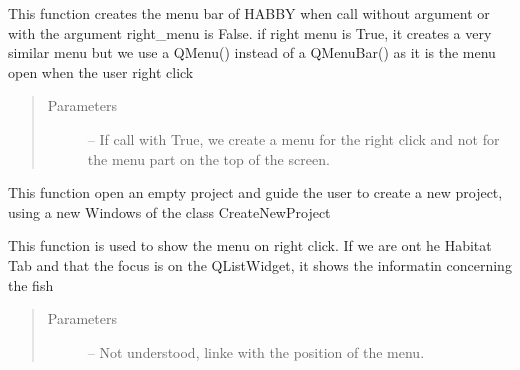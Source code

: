 \documentclass[letterpaper,10pt,english]{sphinxmanual}
\begin{document}
\begin{fulllineitems}
\begin{fulllineitems}
\end{fulllineitems}


\begin{fulllineitems}
\label{\detokenize{index:src_GUI.Main_windows_1.MainWindows.my_menu_bar}}
This function creates the menu bar of HABBY when call without argument or with the argument right\_menu is False.
if right menu is True, it creates a very similar menu but we use a QMenu() instead of a QMenuBar() as it
is the menu open when the user right click
\begin{quote}\begin{description}
\item[{Parameters}] \leavevmode
{} -- If call with True, we create a menu for the right click and not for the menu part on the top
of the screen.

\end{description}\end{quote}

\end{fulllineitems}


\begin{fulllineitems}
\label{\detokenize{index:src_GUI.Main_windows_1.MainWindows.my_toolbar}}
\end{fulllineitems}


\begin{fulllineitems}
\label{\detokenize{index:src_GUI.Main_windows_1.MainWindows.new_project}}
This function open an empty project and guide the user to create a new project, using a new Windows
of the class CreateNewProject

\end{fulllineitems}


\begin{fulllineitems}
\label{\detokenize{index:src_GUI.Main_windows_1.MainWindows.on_context_menu}}
This function is used to show the menu on right click. If we are ont he Habitat Tab and that the focus is on
the QListWidget, it shows the informatin concerning the fish
\begin{quote}\begin{description}
\item[{Parameters}] \leavevmode
{} -- Not understood, linke with the position of the menu.


\end{description}
\end{quote}
\end{fulllineitems}
\end{fulllineitems}
\end{document}

